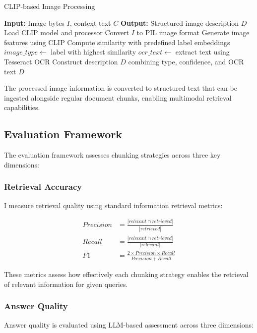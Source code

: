 \documentclass[11pt,a4paper]{article}
\begin{document}
\begin{algorithm}
\caption{CLIP-based Image Processing}
\begin{algorithmic}[1]
\STATE \textbf{Input:} Image bytes $I$, context text $C$
\STATE \textbf{Output:} Structured image description $D$
\STATE Load CLIP model and processor
\STATE Convert $I$ to PIL image format
\STATE Generate image features using CLIP
\STATE Compute similarity with predefined label embeddings
\STATE $image\_type \leftarrow$ label with highest similarity
\STATE $ocr\_text \leftarrow$ extract text using Tesseract OCR
\STATE Construct description $D$ combining type, confidence, and OCR text
\RETURN $D$
\end{algorithmic}
\end{algorithm}

The processed image information is converted to structured text that can be ingested alongside regular document chunks, enabling multimodal retrieval capabilities.

\subsection{Evaluation Framework}

The evaluation framework assesses chunking strategies across three key dimensions:

\subsubsection{Retrieval Accuracy}

I measure retrieval quality using standard information retrieval metrics:

\begin{align}
Precision &= \frac{|relevant \cap retrieved|}{|retrieved|} \\
Recall &= \frac{|relevant \cap retrieved|}{|relevant|} \\
F1 &= \frac{2 \times Precision \times Recall}{Precision + Recall}
\end{align}

These metrics assess how effectively each chunking strategy enables the retrieval of relevant information for given queries.

\subsubsection{Answer Quality}

Answer quality is evaluated using LLM-based assessment across three dimensions:
\end{document}
